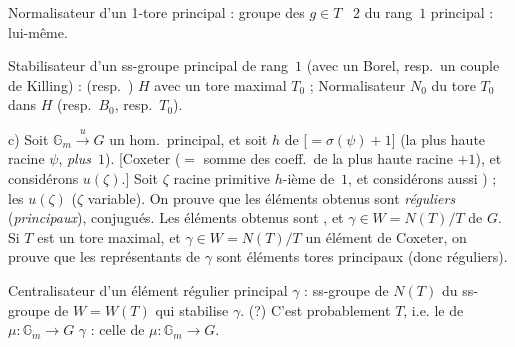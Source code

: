 \documentclass[11pt,a4paper]{article}
\begin{document}
Normalisateur d'un 1-tore principal : groupe \struck{\ill{}} des $g \in T$
~$2$ \struck{\ill{}} du rang~$1$ principal : lui-même.

 Stabilisateur d'un ss-groupe principal de rang~$1$
(avec un Borel, resp.\ un couple de Killing) : 
  \ill{} (resp.\ \ill{}) \ill{}
$H$ avec un tore maximal $T_0$ ; Normalisateur $N_0$ du tore $T_0$ dans $H$
(resp.\ $B_0$, resp.\ $T_0$).




c) Soit $\mathbb{G}_m \xrightarrow{u} G$ un hom.\ principal, et soit
\struck{\ill{}} $h$  de
\ill{} [$=\sigma(\psi)+1$] (la plus haute racine $\psi$, \emph{plus}~$1$).
[Coxeter ($=$ somme des coeff.\ de la plus haute racine $+1$), et
considérons $u(\zeta)$.] Soit $\zeta$  racine primitive $h$-ième
de~$1$, et considérons aussi  \uncertain{$\zeta$} \ill{}
) ; les $u(\zeta)$ ($\zeta$ variable). On prouve que les
éléments obtenus sont \emph{réguliers} (\emph{principaux}), 
conjugués. Les éléments obtenus sont , et
$\gamma \in W = N(T)/T$ \struck{\ill{}} de $G$. Si $T$ est un tore maximal,
et $\gamma \in W = N(T)/T$ un élément de Coxeter, on prouve que les
représentants de $\gamma$ \struck{\ill{}} sont 
éléments \ill{} tores principaux (donc réguliers).


Centralisateur d'un élément régulier principal $\gamma$ : ss-groupe de
$N(T)$ \struck{\ill{}}  du ss-groupe de $W = W(T)$ qui
stabilise $\gamma$. (?) C'est probablement $T$, i.e.
\struck{\ill{}} le  de $\mu : \mathbb{G}_m \to G$ 
$\gamma$  : celle de $\mu : \mathbb{G}_m \to G$.
\end{document}

